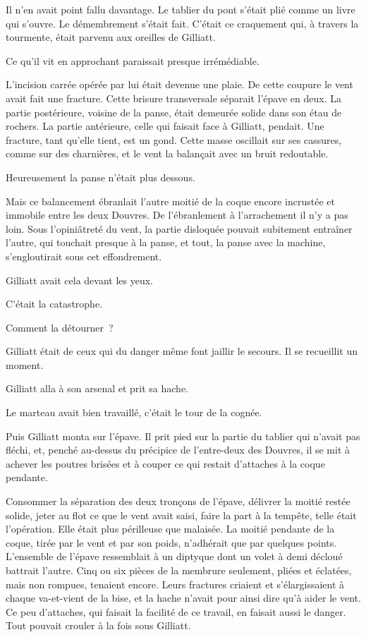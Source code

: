 \documentclass[french,twoside]{book} %
\begin{document}
Il n’en avait point fallu davantage. Le tablier du pont s’était plié comme un livre qui s’ouvre. Le démembrement s’était fait. C’était ce craquement qui, à travers la tourmente, était parvenu aux oreilles de Gilliatt.\par
Ce qu’il vit en approchant paraissait presque irrémédiable.\par
L’incision carrée opérée par lui était devenue une plaie. De cette coupure le vent avait fait une fracture. Cette brisure transversale séparait l’épave en deux. La partie postérieure, voisine de la panse, était demeurée solide dans son étau de rochers. La partie antérieure, celle qui faisait face à Gilliatt, pendait. Une fracture, tant qu’elle tient, est un gond. Cette masse oscillait sur ses cassures, comme sur des charnières, et le vent la balançait avec un bruit redoutable.\par
Heureusement la panse n’était plus dessous.\par
Mais ce balancement ébranlait l’autre moitié de la  coque encore incrustée et immobile entre les deux Douvres. De l’ébranlement à l’arrachement il n’y a pas loin. Sous l’opiniâtreté du vent, la partie disloquée pouvait subitement entraîner l’autre, qui touchait presque à la panse, et tout, la panse avec la machine, s’engloutirait sous cet effondrement.\par
Gilliatt avait cela devant les yeux.\par
C’était la catastrophe.\par
Comment la détourner ?\par
Gilliatt était de ceux qui du danger même font jaillir le secours. Il se recueillit un moment.\par
Gilliatt alla à son arsenal et prit sa hache.\par
Le marteau avait bien travaillé, c’était le tour de la cognée.\par
Puis Gilliatt monta sur l’épave. Il prit pied sur la partie du tablier qui n’avait pas fléchi, et, penché au-dessus du précipice de l’entre-deux des Douvres, il se mit à achever les poutres brisées et à couper ce qui restait d’attaches à la coque pendante.\par
Consommer la séparation des deux tronçons de l’épave, délivrer la moitié restée solide, jeter au flot ce que le vent avait saisi, faire la part à la tempête, telle était l’opération. Elle était plus périlleuse que malaisée. La moitié pendante de la coque, tirée par le vent et par son poids, n’adhérait que par quelques points. L’ensemble de l’épave ressemblait à un diptyque dont un volet à demi décloué battrait l’autre. Cinq ou six pièces de la membrure seulement, pliées et éclatées, mais non rompues, tenaient encore. Leurs fractures criaient et s’élargissaient à chaque va-et-vient  de la bise, et la hache n’avait pour ainsi dire qu’à aider le vent. Ce peu d’attaches, qui faisait la facilité de ce travail, en faisait aussi le danger. Tout pouvait crouler à la fois sous Gilliatt.\par
\end{document}
